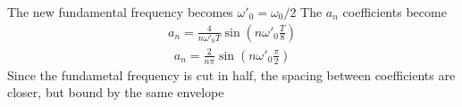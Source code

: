 \documentclass[letterpaper,10pt,english]{jupyterBook}
\begin{document}
\sphinxAtStartPar
The new fundamental frequency becomes \(\omega'_0 =\omega_0/2\)
The \(a_n\) coefficients become
\begin{equation*}
\begin{split}
a_n = \frac{4}{n\omega'_0 T} \sin \left(n\omega'_0\frac{T}{8}\right)
\end{split}
\end{equation*}\begin{equation*}
\begin{split}
a_n = \frac{2}{n\pi} \sin \left(n \omega'_0 \frac{\pi}{2} \right)
\end{split}
\end{equation*}
\sphinxAtStartPar
Since the fundametal frequency is cut in half, the spacing between coefficients are closer, but bound by the same envelope
\end{document}
